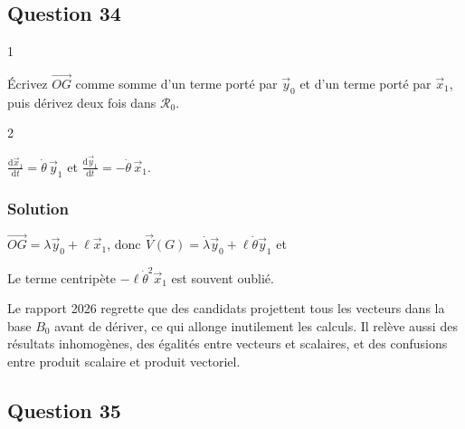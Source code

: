 \documentclass[11pt,a4paper]{article}
\newcommand{\equationajustee}[1]{%
  \sbox{\boiteequation}{$\displaystyle #1$}%
  \ifdim\wd\boiteequation>\linewidth
    \[\resizebox{\linewidth}{!}{\usebox{\boiteequation}}\]%
  \else
    \[#1\]%
  \fi}
\begin{document}
\hypertarget{question-34}{%
\subsection{Question 34}\label{question-34}}

\begin{indication}{1}

Écrivez \(\overrightarrow{OG}\) comme somme d'un terme porté par \(\vec y_0\) et d'un terme porté par \(\vec x_1\), puis dérivez deux fois dans \(\mathcal R_0\).

\end{indication}

\begin{indication}{2}

\(\frac{\mathrm d\vec x_1}{\mathrm dt}=\dot\theta\,\vec y_1\) et \(\frac{\mathrm d\vec y_1}{\mathrm dt}=-\dot\theta\,\vec x_1\).

\end{indication}

\hypertarget{solution-33}{%
\subsubsection{Solution}\label{solution-33}}

\(\overrightarrow{OG}=\lambda\vec y_0+\ell\vec x_1\), donc \(\vec V(G)=\dot\lambda\vec y_0+\ell\dot\theta\vec y_1\) et

\equationajustee{\boxed{\vec a(G/\mathcal R_0)=\ddot\lambda\,\vec y_0+\ell\ddot\theta\,\vec y_1-\ell\dot\theta^2\,\vec x_1}}

\begin{piege}

Le terme centripète \(-\ell\dot\theta^2\vec x_1\) est souvent oublié.

\end{piege}

\begin{jury}

Le rapport 2026 regrette que des candidats projettent tous les vecteurs dans la base \(B_0\) avant de dériver, ce qui allonge inutilement les calculs. Il relève aussi des résultats inhomogènes, des égalités entre vecteurs et scalaires, et des confusions entre produit scalaire et produit vectoriel.

\end{jury}

\hypertarget{question-35}{%
\subsection{Question 35}\label{question-35}}
\end{document}
